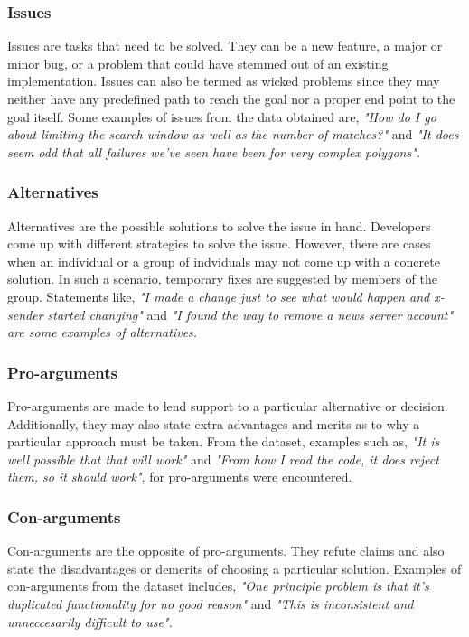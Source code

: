 \documentclass[a4paper,12pt,twoside]{report}
\begin{document}
\subsubsection{Issues}
Issues are tasks that need to be solved. They can be a new feature, a major or minor bug, or a problem that could have stemmed out of an existing implementation. Issues can also be termed as wicked problems \cite{Rittel1973} since they may neither have any predefined path to reach the goal nor a proper end point to the goal itself. Some examples of issues from the data obtained are, \textit{"How do I go about limiting the search window as well as the number of matches?"} and \textit{"It does seem odd that all failures we've seen have been for very complex polygons".}  

\subsubsection{Alternatives}
Alternatives are the possible solutions to solve the issue in hand. Developers come up with different strategies to solve the issue. However, there are cases when an individual or a group of indviduals may not come up with a concrete solution. In such a scenario, temporary fixes are suggested by members of the group. Statements like, \textit{"I made a change just to see what would happen and x-sender started changing"} and \textit{"I found the way to remove a news server account" are some examples of alternatives.}

\subsubsection{Pro-arguments}
Pro-arguments are made to lend support to a particular alternative or decision. Additionally, they may also state extra advantages and merits as to why a particular approach must be taken. From the dataset, examples such as, \textit{"It is well possible that that will work"} and \textit{"From how I read the code, it does reject them, so it should work"}, for pro-arguments were encountered. 

\subsubsection{Con-arguments}
Con-arguments are the opposite of pro-arguments. They refute claims and also state the disadvantages or demerits of choosing a particular solution. Examples of con-arguments from the dataset includes, \textit{"One principle problem is that it's duplicated functionality for no good reason"} and \textit{"This is inconsistent and unneccesarily difficult to use".}
\end{document}
